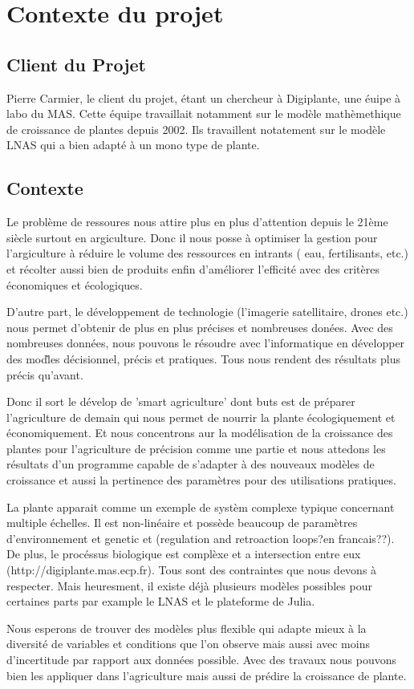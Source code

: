 \section{Contexte du projet}

\subsection{Client du Projet}

Pierre Carmier, le client du projet, \'etant un chercheur à Digiplante, une \'euipe à labo du MAS. Cette \'equipe travaillait notamment sur le mod\`ele math\`emethique de croissance de plantes depuis 2002. Ils travaillent notatement sur le mod\`ele LNAS qui a bien adapt\'e \`a un mono type de plante.
\subsection{Contexte}

Le probl\`eme de ressoures nous attire plus en plus d'attention depuis le 21\`eme si\`ecle surtout en argiculture. Donc il nous posse \`a optimiser la gestion pour l'argiculture \`a r\'eduire le volume des ressources en intrants ( eau, fertilisants, etc.) et r\'ecolter aussi bien de produits enfin d'am\'eliorer l'efficit\'e avec des crit\`eres \'economiques et \'ecologiques.

D'autre part, le d\'eveloppement de technologie (l'imagerie satellitaire, drones etc.) nous permet d'obtenir de plus en plus pr\'ecises et nombreuses don\'ees. Avec des nombreuses donn\'ees, nous pouvons le r\'esoudre avec l'informatique en d\'evelopper des mod\`les d\'ecisionnel, pr\'ecis et pratiques. Tous nous rendent des r\'esultats plus pr\'ecis qu'avant.

Donc il sort le d\'evelop de 'smart agriculture' dont buts est de pr\'eparer l'agriculture de demain qui nous permet de nourrir la plante \'ecologiquement et  \'economiquement. Et nous concentrons aur la mod\'elisation de la croissance des plantes pour l'agriculture de pr\'ecision comme une partie et nous attedons les r\'esultats d'un programme capable de s'adapter \`a des nouveaux mod\`eles de croissance et aussi la pertinence des param\`etres pour des utilisations pratiques. 

La plante apparait comme un exemple de syst\`em complexe typique concernant multiple \'echelles. Il est non-lin\'eaire et poss\`ede beaucoup de param\`etres d'environnement et genetic et (regulation and retroaction loops?en francais??). De plus,  le proc\'essus biologique est compl\`exe et a intersection entre eux (http://digiplante.mas.ecp.fr). Tous sont des contraintes que nous devons \`a respecter. Mais heuresment, il existe d\'ej\`a plusieurs mod\`eles possibles pour certaines parts par example le LNAS et le plateforme de Julia.

Nous esperons de trouver des mod\`eles plus flexible qui adapte mieux \`a la diversit\'e de variables et conditions que l'on observe mais aussi avec moins d'incertitude par rapport aux donn\'ees possible. Avec des travaux nous pouvons bien les appliquer dans l'agriculture mais aussi de pr\'edire la croissance de plante.
